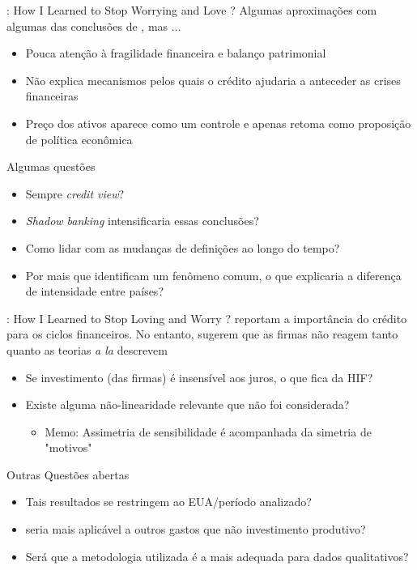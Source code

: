\documentclass[presentation]{beamer}
\begin{document}
\begin{frame}[label={sec:org70e84dd}]{\textcite{schularickCreditBoomsGone2012}: How I Learned to Stop Worrying and Love \textcite{minsky_1977_Financial}?}
Algumas aproximações com algumas das conclusões de \textcite{minsky_1977_Financial}, mas \(\ldots\)

\begin{itemize}
\item Pouca atenção à fragilidade financeira e balanço patrimonial
\item Não explica mecanismos pelos quais o crédito ajudaria a anteceder as crises financeiras
\item Preço dos ativos aparece como um controle e apenas retoma como proposição de política econômica
\end{itemize}

\begin{block}{Algumas questões}
\begin{itemize}
\item Sempre \emph{credit view}?
\item \emph{Shadow banking} intensificaria essas conclusões?
\item Como lidar com as mudanças de definições ao longo do tempo?
\item Por mais que identificam um fenômeno comum, o que explicaria a diferença de intensidade entre países?
\end{itemize}
\end{block}
\end{frame}

\begin{frame}[label={sec:org47eba95}]{\textcite{sharpe_2020_Why}: How I Learned to Stop Loving and Worry \textcite{minsky_1977_Financial}?}
\textcite{schularickCreditBoomsGone2012} reportam a importância do crédito para os ciclos financeiros. No entanto, \textcite{sharpe_2020_Why} sugerem que as firmas não reagem tanto quanto as teorias \emph{a la} \cite{minsky_1977_Financial} descrevem

\begin{itemize}
\item Se investimento (das firmas) é insensível aos juros, o que fica da HIF?
\item Existe alguma não-linearidade relevante que não foi considerada?
\begin{itemize}
\item \alert{Memo:} Assimetria de sensibilidade é acompanhada da simetria de "motivos"
\end{itemize}
\end{itemize}

\begin{block}{Outras Questões abertas}
\begin{itemize}
\item Tais resultados se restringem ao EUA/período analizado?
\item \textcite{minsky_1977_Financial} seria mais aplicável a outros gastos que não investimento produtivo?
\item Será que a metodologia utilizada é a mais adequada para dados qualitativos?
\end{itemize}
\end{block}
\end{frame}
\end{document}
